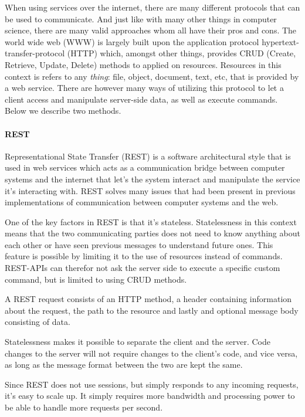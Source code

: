 \documentclass{article}
\begin{document}
When using services over the internet, there are many different protocols that can be used to communicate.
And just like with many other things in computer science, there are many valid approaches whom all have their
pros and cons. The world wide web (WWW) is largely built upon the application protocol
hypertext-transfer-protocol (HTTP) which, amongst other things, provides CRUD (Create, Retrieve, Update, Delete)
methods to applied on resources. Resources in this context is refers to any \textit{thing}: file, object, document,
text, etc, that is provided by a web service. There are however many ways of utilizing this protocol to let a
client access and manipulate server-side data, as well as execute commands. Below we describe two methods.

\paragraph{REST}

Representational State Transfer (REST) is a software architectural style
that is used in web services which acts as a communication bridge
between computer systems and the internet that let's the system interact
and manipulate the service it's interacting with. REST solves many
issues that had been present in previous implementations of
communication between computer systems and the web.

One of the key factors in REST is that it's stateless. Statelessness in
this context means that the two communicating parties does not need to
know anything about each other or have seen previous messages to
understand future ones. This feature is possible by limiting it to the
use of resources instead of commands. REST-APIs can therefor not ask the
server side to execute a specific custom command, but is limited to
using CRUD methods.

A REST request consists of an HTTP method, a header containing
information about the request, the path to the resource and lastly and
optional message body consisting of data.\cite{rest1}\cite{rest2}

Statelessness makes it possible to separate the client and the server.
Code changes to the server will not require changes to the client's
code, and vice versa, as long as the message format between the two are
kept the same.

Since REST does not use sessions, but simply responds to any incoming
requests, it's easy to scale up. It simply requires more bandwidth and
processing power to be able to handle more requests per second.
\end{document}
